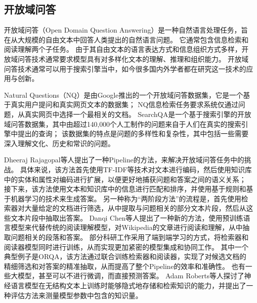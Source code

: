 \subsection{开放域问答}
开放域问答\cite{allam2012question}（Open Domain Question Answering）是一种自然语言处理任务，旨在从大规模的自由文本中回答人类提出的自然语言问题。
它通常包含信息检索和阅读理解两个子任务。
由于其自由文本的语言表达方式和信息组织方式多样，开放域问答技术通常要求模型具有对多样化文本的理解、推理和组织能力。
开放域问答技术通常可以用于搜索引擎当中，如今很多国内外学者都在研究这一技术的应用与创新。

Natural Questions\cite{Kwiatkowski2019NaturalQA}（NQ）是由Google推出的一个开放域问答数据集，它是一个基于真实用户提问和真实网页文本的数据集；
NQ信息检索任务要求系统仅通过问题，从真实网页中选择一个最相关的文档。
SearchQA\cite{Dunn2017SearchQAAN}是一个基于搜索引擎的开放域问答数据集，其中由超过140,000个人工制作的问题来自于人们在真实的搜索引擎中提出的查询；
该数据集的特点是问题的多样性和复杂性，其中包括一些需要深入理解文化、历史和常识的问题。

Dheeraj Rajagopal等人\cite{Sun2018OpenDQ}提出了一种Pipeline的方法，来解决开放域问答任务中的挑战。
具体来说，该方法首先使用TF-IDF\cite{SprckJones2021ASI}等技术对文本进行编码，然后使用知识库中的实体和属性对编码进行扩展，以便更好地捕获问题和答案之间的语义关系；
接下来，该方法使用文本和知识库中的信息进行匹配和排序，并使用基于规则和基于机器学习的技术来生成答案。
另一种称为“两阶段方法”的流程是，首先使用检索器对大量给定的文档进行筛选，从中提取与问题相关的部分文本片段，然后从这些文本片段中抽取出答案。
Danqi Chen等人\cite{Chen2017ReadingWT}提出了一种新的方法，使用预训练语言模型来代替传统的阅读理解模型，对Wikipedia的文章进行阅读和理解，从中抽取问题相关的段落和答案。
部分科研工作采用了端到端学习的方式，将检索器和阅读器模型同时进行训练，从而实现更加紧密的模型集成和协同工作。
其中一个典型例子是ORQA\cite{lee2019orqa}，该方法通过联合训练检索器和阅读器，实现了对候选文档的精细筛选和对答案的精准抽取，从而提高了整个Pipeline的效率和准确性。
也有一些大模型，甚至可以不进行微调，而直接预测答案。
Adam Roberts等人\cite{Roberts2020HowMK}探讨了神经语言模型在无结构文本上训练时能够隐式地存储和检索知识的能力，并提出了一种评估方法来测量模型参数中包含的知识量。


